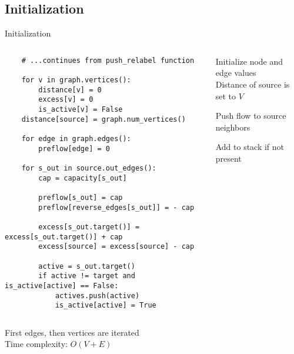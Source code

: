 \documentclass{beamer}
\begin{document}
\subsection{Initialization}
\begin{frame}[fragile]{Initialization}
    \begin{columns}[T]
        \begin{column}{0.50\textwidth}
            \begin{lstlisting}
    # ...continues from push_relabel function

    for v in graph.vertices():
        distance[v] = 0
        excess[v] = 0
        is_active[v] = False
    distance[source] = graph.num_vertices()

    for edge in graph.edges():
        preflow[edge] = 0

    for s_out in source.out_edges():
        cap = capacity[s_out]

        preflow[s_out] = cap
        preflow[reverse_edges[s_out]] = - cap

        excess[s_out.target()] = excess[s_out.target()] + cap
        excess[source] = excess[source] - cap

        active = s_out.target()
        if active != target and is_active[active] == False:
            actives.push(active)
            is_active[active] = True
            \end{lstlisting}
        \end{column}

        \begin{column}{0.45\textwidth}
            \begin{sidecomment}
                \pause
                \vskip 53bp
                Initialize node and edge values
                \\Distance of source is set to $V$

                \pause
                \vskip 22bp
                Push flow to source neighbors

                \pause
                \vskip 53bp
                Add to stack if not present
            \end{sidecomment}
        \end{column}
    \end{columns}

    \pause
    \vspace*{\fill}
    First edges, then vertices are iterated
    \\Time complexity: $O(V+E)$
\end{frame}
\end{document}
